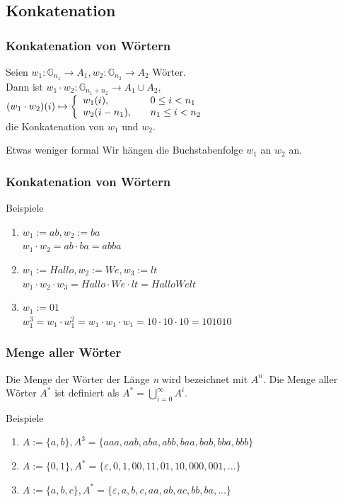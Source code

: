 \documentclass{beamer}
\begin{document}
\subsection{Konkatenation}
\begin{frame}
  \frametitle{Konkatenation von Wörtern}
  \begin{definition}
    Seien $w_1: \mathbb{G}_{n_1} \rightarrow A_1, w_2: \mathbb{G}_{n_2} \rightarrow A_2$ Wörter.\\
    Dann ist $w_1 \cdot w_2: \mathbb{G}_{n_1 + n_2} \rightarrow A_1 \cup A_2,$
    $(w_1 \cdot w_2)(i) \mapsto \left\{
        \begin{array}{l l}
          w_1(i), & \quad 0 \leq i < n_1\\
          w_2(i-n_1), & \quad n_1 \leq i < n_2\\
        \end{array} \right.
    $\\
    die Konkatenation von $w_1$ und $w_2$.
  \end{definition}\pause
  \begin{alertblock}{Etwas weniger formal}
    Wir hängen die Buchstabenfolge $w_1$ an $w_2$ an.
  \end{alertblock}
\end{frame}
\begin{frame}
  \frametitle{Konkatenation von Wörtern}
  \begin{exampleblock}{Beispiele}
    \begin{enumerate}
      \item $w_1 := ab, w_2 := ba$\\
             $w_1 \cdot w_2 = ab \cdot ba = abba$
      \item $w_1 := Hallo, w_2 := We, w_3 := lt$\\
             $w_1 \cdot w_2  \cdot w_3 = Hallo \cdot We \cdot lt = HalloWelt$
      \item $w_1 := 01$\\
             $w_1^3 = w_1 \cdot w_1^2 = w_1 \cdot w_1 \cdot w_1 = 10 \cdot 10 \cdot 10 = 101010$
    \end{enumerate}
  \end{exampleblock}
\end{frame}

\begin{frame}
  \frametitle{Menge aller Wörter}
  \begin{definition}
    Die Menge der Wörter der Länge \emph{n} wird bezeichnet mit $A^n$. Die Menge aller Wörter $A^*$ ist definiert als $A^* = \bigcup \limits^{\infty}_{i=0} A^i$.
  \end{definition}
  \begin{exampleblock}{Beispiele}
    \begin{enumerate}
      \item $A := \{a, b\}, A^3 = \{aaa, aab, aba, abb, baa, bab, bba, bbb\}$
      \item $A := \{0, 1\}, A^* = \{\varepsilon, 0, 1, 00, 11, 01, 10, 000, 001, ...\}$
      \item $A := \{a, b, c\}, A^* = \{\varepsilon, a, b, c, aa, ab, ac, bb, ba, ...\}$
    \end{enumerate}
  \end{exampleblock}
\end{frame}
\end{document}
